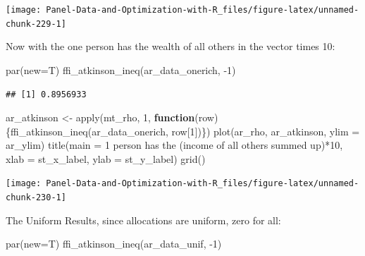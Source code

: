 \documentclass[
]{book}
\newenvironment{Shaded}{\begin{snugshade}}{\end{snugshade}}
\newcommand{\AttributeTok}[1]{\textcolor[rgb]{0.77,0.63,0.00}{#1}}
\newcommand{\ControlFlowTok}[1]{\textcolor[rgb]{0.13,0.29,0.53}{\textbf{#1}}}
\newcommand{\DecValTok}[1]{\textcolor[rgb]{0.00,0.00,0.81}{#1}}
\newcommand{\FunctionTok}[1]{\textcolor[rgb]{0.00,0.00,0.00}{#1}}
\newcommand{\NormalTok}[1]{#1}
\newcommand{\OtherTok}[1]{\textcolor[rgb]{0.56,0.35,0.01}{#1}}
\newcommand{\SpecialCharTok}[1]{\textcolor[rgb]{0.00,0.00,0.00}{#1}}
\newcommand{\StringTok}[1]{\textcolor[rgb]{0.31,0.60,0.02}{#1}}
\begin{document}
\begin{center}\texttt{[image: Panel-Data-and-Optimization-with-R\_files/figure-latex/unnamed-chunk-229-1]} \end{center}

Now with the one person has the wealth of all others in the vector times 10:

\begin{Shaded}
\begin{Highlighting}[]
\FunctionTok{par}\NormalTok{(}\AttributeTok{new=}\NormalTok{T)}
\FunctionTok{ffi\_atkinson\_ineq}\NormalTok{(ar\_data\_onerich, }\SpecialCharTok{{-}}\DecValTok{1}\NormalTok{)}
\end{Highlighting}
\end{Shaded}

\begin{verbatim}
## [1] 0.8956933
\end{verbatim}

\begin{Shaded}
\begin{Highlighting}[]
\NormalTok{ar\_atkinson }\OtherTok{\textless{}{-}} \FunctionTok{apply}\NormalTok{(mt\_rho, }\DecValTok{1}\NormalTok{, }\ControlFlowTok{function}\NormalTok{(row)\{}\FunctionTok{ffi\_atkinson\_ineq}\NormalTok{(ar\_data\_onerich, row[}\DecValTok{1}\NormalTok{])\})}
\FunctionTok{plot}\NormalTok{(ar\_rho, ar\_atkinson, }\AttributeTok{ylim =}\NormalTok{ ar\_ylim)}
\FunctionTok{title}\NormalTok{(}\AttributeTok{main =} \StringTok{\textquotesingle{}1 person has the (income of all others summed up)*10\textquotesingle{}}\NormalTok{, }\AttributeTok{xlab =}\NormalTok{ st\_x\_label, }\AttributeTok{ylab =}\NormalTok{ st\_y\_label)}
\FunctionTok{grid}\NormalTok{()}
\end{Highlighting}
\end{Shaded}

\begin{center}\texttt{[image: Panel-Data-and-Optimization-with-R\_files/figure-latex/unnamed-chunk-230-1]} \end{center}

The Uniform Results, since allocations are uniform, zero for all:

\begin{Shaded}
\begin{Highlighting}[]
\FunctionTok{par}\NormalTok{(}\AttributeTok{new=}\NormalTok{T)}
\FunctionTok{ffi\_atkinson\_ineq}\NormalTok{(ar\_data\_unif, }\SpecialCharTok{{-}}\DecValTok{1}\NormalTok{)}
\end{Highlighting}
\end{Shaded}
\end{document}

